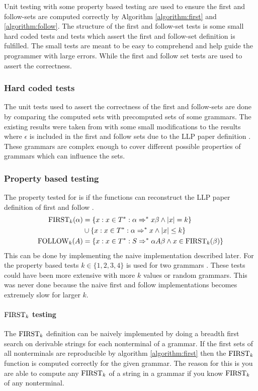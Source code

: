 Unit testing with some property based testing are used to ensure the first and follow-sets are computed correctly by Algorithm \ref{algorithm:first} and \ref{algorithm:follow}. The structure of the first and follow-set tests is some small hard coded tests and tests which assert the first and follow-set definition is fulfilled. The small tests are meant to be easy to comprehend and help guide the programmer with large errors. While the first and follow set tests are used to assert the correctness.

\subsubsection{Hard coded tests}
The unit tests used to assert the correctness of the first and follow-sets are done by comparing the computed sets with precomputed sets of some grammars. The existing results were taken from \cite[58, 62, 63, 65]{Mogensen} with some small modifications to the results where $\epsilon$ is included in the first and follow sets due to the LLP paper definition \cite[5]{Vagner2007}. These grammars are complex enough to cover different possible properties of grammars which can influence the sets.

\subsubsection{Property based testing}
The property tested for is if the functions can reconstruct the LLP paper definition of first and follow \cite[5]{Vagner2007}.
\begin{align*}
    \text{FIRST}_k(\alpha) &= \{x : x \in T^* : \alpha \Rightarrow^* x \beta \land |x| = k\} \\ 
    \, &\cup \{x : x \in T^* : \alpha \Rightarrow^* x \land |x| \leq k\} \\
    \text{FOLLOW}_k(A) &= \{x : x \in T^* : S \Rightarrow^* \alpha A \beta \land x \in \text{FIRST}_k(\beta)\}
\end{align*}
This can be done by implementing the naive implementation described later. For the property based tests $k \in \{1, 2, 3, 4\}$ is used for two grammars \cite[62, 63]{Mogensen}. These tests could have been more extensive with more $k$ values or random grammars. This was never done because the naive first and follow implementations becomes extremely slow for larger $k$.

\paragraph{\texorpdfstring{$\text{FIRST}_k$}{TEXT} testing}
The $\text{FIRST}_k$ definition can be naively implemented by doing a breadth first search on derivable strings for each nonterminal of a grammar. If the first sets of all nonterminals are reproducible by algorithm \ref{algorithm:first} then the $\text{FIRST}_k$ function is computed correctly for the given grammar. The reason for this is you are able to compute any $\text{FIRST}_k$ of a string in a grammar if you know $\text{FIRST}_k$ of any nonterminal.

